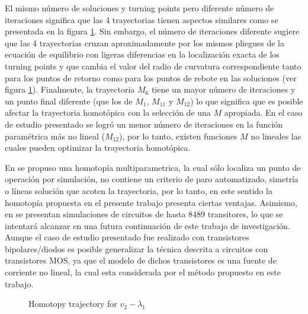 \documentclass[conference,letterpaper,twocolumn]{IEEEtran}
\begin{document}
El mismo número de soluciones y turning points pero diferente número de iteraciones significa que 
las 4 trayectorias tienen aspectos similares como se presentada en la figura \ref{yamaie}. Sin embargo,
el número de iteraciones diferente sugiere que las 4 trayectorias cruzan aproximadamente por los mismos pliegues de la ecuación
de equilibrio con ligeras diferencias en la localización exacta de los turning points y que cambia el valor del radio de curvatura correspondiente tanto para los puntos de retorno como para los puntos de rebote en las soluciones (ver figura \ref{yamaie}). Finalmente, la trayectoria $M_6$ tiene un mayor número de iteraciones
y un punto final diferente (que los de $M_1$, $M_{11}$ y $M_{12}$) lo que significa que es posible afectar
la trayectoria homotópica con la selección de una $M$ apropiada. En el caso de estudio presentado
se logró un menor número de iteraciones en la función paramétrica más no lineal ($M_{12}$), por lo tanto, existen funciones $M$ no lineales las cuales pueden optimizar la trayectoria homotópica. 



En \cite{homo_MOS} se propuso una homotopía multiparametrica, la cual sólo localiza un punto de operación por simulación,
no contiene un criterio de paro automatizado, simetría o líneas solución que acoten la trayectoria, por lo tanto,
en este sentido la homotopía propuesta en el presente trabajo presenta ciertas ventajas. Asimismo, en \cite{homo_MOS}
se presentan simulaciones de circuitos de hasta 8489 transitores, lo que se intentará alcanzar en una futura  continuación
de este trabajo de investigación. Aunque el caso de estudio presentado fue realizado con transistores bipolares/diodos es posible generalizar la técnica descrita a circuitos con transistores MOS, ya que el modelo de dichos transistores es una fuente de corriente no lineal, la cual esta considerada por el método propuesto en este trabajo.

\begin{figure}[hbtp]
\centerline{
\epsfxsize=105mm
}
\caption{Homotopy trajectory for $v_2-\lambda_1$}
\label{yamaie}
\end{figure}
\end{document}
